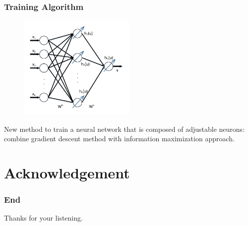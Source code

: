 \documentclass[10pt, mathserif]{beamer}	%
\newcommand{\ftitle}[1]{\frametitle{\hspace{4ex} {#1}}}	%
\begin{document}
\begin{CJK}{UTF8}{song}
\begin{frame}
	\ftitle{Training Algorithm}
	\begin{figure}[htbp]
		\centering
		\includegraphics[width=0.5\textwidth]{fnn.pdf}
	\end{figure}
	New method to train a neural network that is composed of adjustable neurons: \\
	combine gradient descent method with {\color{red}information maximization approach}.
\end{frame}

%    
%    

\section*{Acknowledgement}
\begin{frame}
	\ftitle{End}
	\Huge Thanks for your listening. \\
\end{frame}

\end{CJK}
\end{document}

